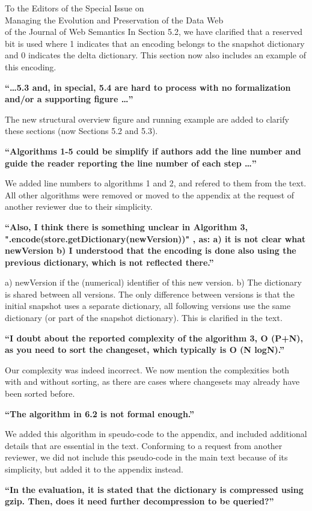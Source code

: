 \documentclass{letter}
\newcounter{section}
\begin{document}
\begin{letter}{To the Editors of the Special Issue on\\Managing the Evolution and Preservation of the Data Web\\of the Journal of Web Semantics}
In Section 5.2, we have clarified that a reserved bit is used where 1 indicates that an encoding
belongs to the snapshot dictionary and 0 indicates the delta dictionary.
This section now also includes an example of this encoding.

\textbf{\enquote{\ldots 5.3 and, in special, 5.4 are hard to process with no formalization and/or a supporting figure \ldots}}

The new structural overview figure and running example are added to clarify these sections (now Sections 5.2 and 5.3).

\textbf{\enquote{Algorithms 1-5 could be simplify if authors add the line number and guide the reader reporting the line number of each step \ldots}}

We added line numbers to algorithms 1 and 2, and refered to them from the text.
All other algorithms were removed or moved to the appendix at the request of another reviewer due to their simplicity.

\textbf{\enquote{Also, I think there is something unclear in Algorithm 3, ".encode(store.getDictionary(newVersion))" , as: a) it is not clear what newVersion b) I understood that the encoding is done also using the previous dictionary, which is not reflected there.}}

a) newVersion if the (numerical) identifier of this new version.
b) The dictionary is shared between all versions. The only difference between versions is that the initial snapshot uses a separate dictionary, all following versions use the same dictionary (or part of the snapshot dictionary).
This is clarified in the text.

\textbf{\enquote{I doubt about the reported complexity of the algorithm 3, O (P+N), as you need to sort the changeset, which typically is O (N logN).}}

Our complexity was indeed incorrect. We now mention the complexities both with and without sorting,
as there are cases where changesets may already have been sorted before.

\textbf{\enquote{The algorithm in 6.2 is not formal enough.}}

We added this algorithm in speudo-code to the appendix,
and included additional details that are essential in the text.
Conforming to a request from another reviewer, we did not include this pseudo-code in the main text because of its simplicity,
but added it to the appendix instead.

\textbf{\enquote{In the evaluation, it is stated that the dictionary is compressed using gzip. Then, does it need further decompression to be queried?}}


\end{letter}
\end{document}
